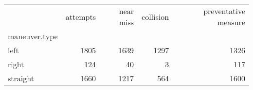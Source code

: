 \begin{tabular}{lrrrr}
\toprule
{} &  attempts &  near miss &  collision &  preventative measure \\
maneuver.type &           &            &            &                       \\
\midrule
left          &      1805 &       1639 &       1297 &                  1326 \\
right         &       124 &         40 &          3 &                   117 \\
straight      &      1660 &       1217 &        564 &                  1600 \\
\bottomrule
\end{tabular}
